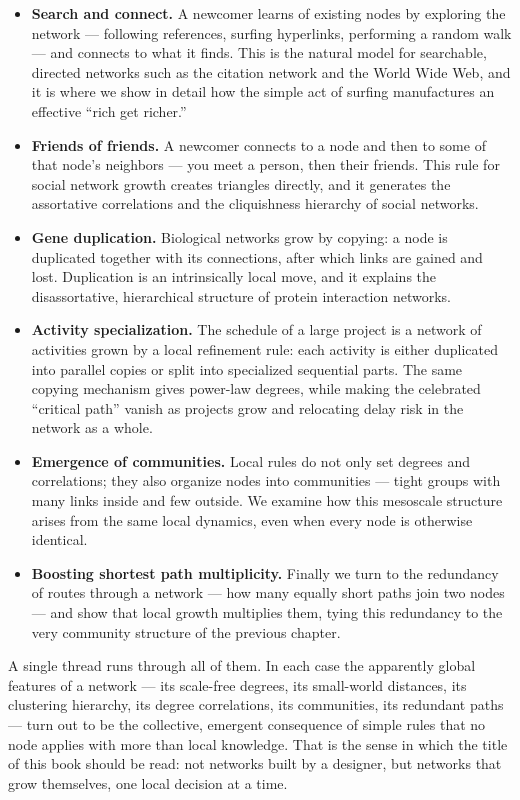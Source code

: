 \begin{itemize}
  \item \textbf{Search and connect.} A newcomer learns of existing nodes by
    exploring the network --- following references, surfing hyperlinks,
    performing a random walk --- and connects to what it finds. This is the
    natural model for searchable, directed networks such as the citation network
    and the World Wide Web, and it is where we show in detail how the simple act
    of surfing manufactures an effective ``rich get richer.''

  \item \textbf{Friends of friends.} A newcomer connects to a node and then to
    some of that node's neighbors --- you meet a person, then their friends. This
    rule for social network growth creates triangles directly, and it generates
    the assortative correlations and the cliquishness hierarchy of social
    networks.

  \item \textbf{Gene duplication.} Biological networks grow by copying: a node is
    duplicated together with its connections, after which links are gained and
    lost. Duplication is an intrinsically local move, and it explains the
    disassortative, hierarchical structure of protein interaction networks.

  \item \textbf{Activity specialization.} The schedule of a large project is a
    network of activities grown by a local refinement rule: each activity is
    either duplicated into parallel copies or split into specialized sequential
    parts. The same copying mechanism gives power-law degrees, while making the
    celebrated ``critical path'' vanish as projects grow and relocating delay
    risk in the network as a whole.

  \item \textbf{Emergence of communities.} Local rules do not only set degrees
    and correlations; they also organize nodes into communities --- tight groups
    with many links inside and few outside. We examine how this mesoscale
    structure arises from the same local dynamics, even when every node is
    otherwise identical.

  \item \textbf{Boosting shortest path multiplicity.} Finally we turn to the
    redundancy of routes through a network --- how many equally short paths join
    two nodes --- and show that local growth multiplies them, tying this
    redundancy to the very community structure of the previous chapter.
\end{itemize}

A single thread runs through all of them. In each case the apparently global
features of a network --- its scale-free degrees, its small-world distances, its
clustering hierarchy, its degree correlations, its communities, its redundant
paths --- turn out to be the collective, emergent consequence of simple rules that
no node applies with more than local knowledge. That is the sense in which the
title of this book should be read: not networks built by a designer, but networks
that grow themselves, one local decision at a time.
